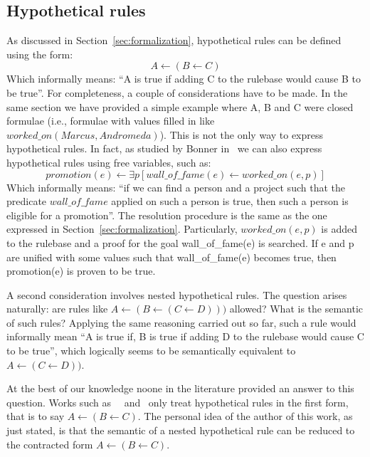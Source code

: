 \begin{appendices}
  \section{Hypothetical rules}
  \label{app:hyr}
  As discussed in Section~\ref{sec:formalization}, hypothetical rules can be defined
  using the form:
  \begin{equation}
    A \leftarrow (B \leftarrow C)
  \end{equation}
  Which informally means: ``A is true if adding C to the rulebase would cause B to be true''.
  For completeness, a couple of considerations have to be made.
  In the same section we have provided a simple example where A, B and C were closed formulae
  (i.e., formulae with values filled in like $worked\_on(Marcus, Andromeda)$). This
  is not the only way to express hypothetical rules.
  In fact, as studied by Bonner in~\cite{Bonner88alogic} we can also express
  hypothetical rules using free variables, such as:
  \begin{equation}
    promotion(e) \leftarrow \exists p [wall\_of\_fame(e) \leftarrow worked\_on(e, p)]
  \end{equation}
  Which informally means: ``if we can find a person and a project such that the
  predicate $wall\_of\_fame$ applied on such a person is true, then such a person
  is eligible for a promotion''. The resolution procedure is the same as the one expressed
  in Section~\ref{sec:formalization}. Particularly, $worked\_on(e,p)$ is added
  to the rulebase and a proof for the goal wall\_of\_fame(e) is searched.
  If e and p are unified with some values such that wall\_of\_fame(e) becomes true, then
  promotion(e) is proven to be true.

  A second consideration involves nested hypothetical rules. The question arises naturally:
  are rules like $A \leftarrow (B \leftarrow (C \leftarrow D)))$ allowed? What
  is the semantic of such rules? Applying the same reasoning carried out so far,
  such a rule would informally mean ``A is true if, B is true if adding D to the rulebase
  would cause C to be true'', which logically seems to be semantically equivalent to
  $A \leftarrow (C \leftarrow D))$.

  At the best of our knowledge noone in the literature provided an answer to this question.
  Works such as~\cite{Bonner88alogic}~\cite{Gabbay1984319}
  and~\cite{Bonner94hypotheticalreasoning} only treat hypothetical rules in the first
  form, that is to say $A \leftarrow (B \leftarrow C)$. The personal idea of the author
  of this work, as just stated, is that the semantic of a nested hypothetical rule
  can be reduced to the contracted form $A \leftarrow (B \leftarrow C)$.
\end{appendices}
